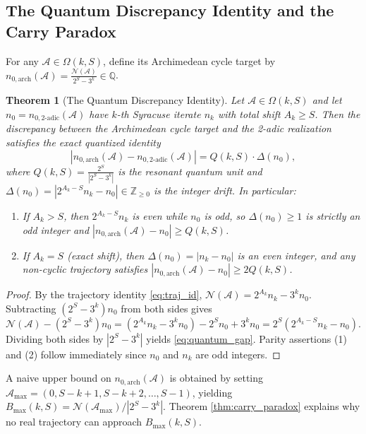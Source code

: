\documentclass[11pt, a4paper]{amsart}
\newtheorem{theorem}{Theorem}[section]
\theoremstyle{definition}
\newcommand{\Z}{\mathbb{Z}}
\newcommand{\Q}{\mathbb{Q}}
\newcommand{\N}{\mathcal{N}}
\newcommand{\A}{\mathcal{A}}
\begin{document}
\subsection{The Quantum Discrepancy Identity and the Carry Paradox}

For any $\A \in \Omega(k, S)$, define its Archimedean cycle target by $n_{0,\text{arch}}(\A) = \frac{\N(\A)}{2^S - 3^k} \in \Q$.

\begin{theorem}[The Quantum Discrepancy Identity]\label{thm:quantum}
Let $\A \in \Omega(k, S)$ and let $n_0 = n_{0,\text{2-adic}}(\A)$ have $k$-th Syracuse iterate $n_k$ with total shift $A_k \ge S$. Then the discrepancy between the Archimedean cycle target and the 2-adic realization satisfies the exact quantized identity
\begin{equation}\label{eq:quantum_gap}
\left| n_{0,\text{arch}}(\A) - n_{0,\text{2-adic}}(\A) \right| = Q(k, S) \cdot \Delta(n_0),
\end{equation}
where $Q(k, S) = \frac{2^S}{|2^S - 3^k|}$ is the resonant quantum unit and $\Delta(n_0) = |2^{A_k - S} n_k - n_0| \in \Z_{\ge 0}$ is the integer drift. In particular:
\begin{enumerate}
    \item If $A_k > S$, then $2^{A_k - S} n_k$ is even while $n_0$ is odd, so $\Delta(n_0) \ge 1$ is strictly an odd integer and $|n_{0,\text{arch}}(\A) - n_0| \ge Q(k, S)$.
    \item If $A_k = S$ (exact shift), then $\Delta(n_0) = |n_k - n_0|$ is an even integer, and any non-cyclic trajectory satisfies $|n_{0,\text{arch}}(\A) - n_0| \ge 2 Q(k, S)$.
\end{enumerate}
\end{theorem}

\begin{proof}
By the trajectory identity \eqref{eq:traj_id}, $\N(\A) = 2^{A_k} n_k - 3^k n_0$. Subtracting $(2^S - 3^k) n_0$ from both sides gives
\[
\N(\A) - (2^S - 3^k) n_0 = (2^{A_k} n_k - 3^k n_0) - 2^S n_0 + 3^k n_0 = 2^S \left( 2^{A_k - S} n_k - n_0 \right).
\]
Dividing both sides by $|2^S - 3^k|$ yields \eqref{eq:quantum_gap}. Parity assertions (1) and (2) follow immediately since $n_0$ and $n_k$ are odd integers.
\end{proof}

A naive upper bound on $n_{0,\text{arch}}(\A)$ is obtained by setting $\A_{\max} = (0, S-k+1, S-k+2, \dots, S-1)$, yielding $B_{\max}(k, S) = \N(\A_{\max}) / |2^S - 3^k|$. Theorem \ref{thm:carry_paradox} explains why no real trajectory can approach $B_{\max}(k, S)$.
\end{document}
